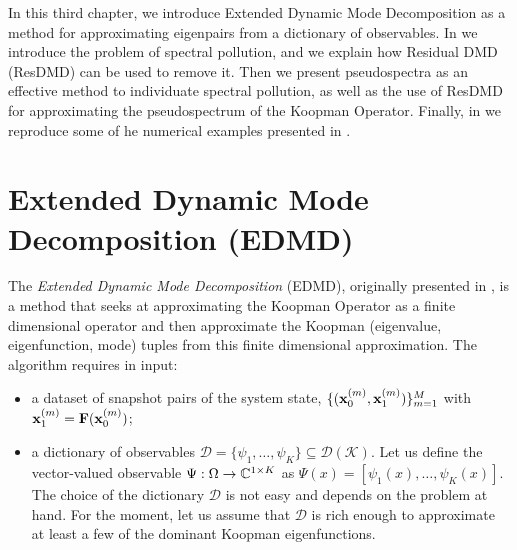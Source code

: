 \label{chapter_edmd}
In this third chapter, we introduce Extended Dynamic Mode Decomposition as a method for approximating eigenpairs from a dictionary of observables. In  we introduce the problem of spectral pollution, and we explain how Residual DMD (ResDMD) can be used to remove it. Then we present pseudospectra as an effective method to individuate spectral pollution, as well as the use of ResDMD for approximating the pseudospectrum of the Koopman Operator. Finally, in  we reproduce some of he numerical examples presented in \cite{colbrook_rigorous_2021}.

\section{Extended Dynamic Mode Decomposition (EDMD)}
\label{section_edmd}
The \emph{Extended Dynamic Mode Decomposition} (EDMD), originally presented in \cite{williams_data-driven_2015}, is a method that seeks at approximating the Koopman Operator as a finite dimensional operator and then approximate the Koopman (eigenvalue, eigenfunction, mode) tuples from this finite dimensional approximation. The algorithm requires in input:
\begin{itemize}
    \item a dataset of snapshot pairs of the system state, $\{(\vb{x}_0^{(m)}, \vb{x}_1^{(m)})\}_{m = 1}^M$ with $\vb{x}_1^{(m)} = \vb{F}(\vb{x}_0^{(m)})$;
    \item a dictionary of observables $\mathcal{D} = \{\psi_1, \dots, \psi_K\} \subseteq \mathcal{D}(\mathcal{K})$. Let us define the vector-valued observable $\Psi:\Omega\to\mathbb{C}^{1\times K}$ as $\Psi(x) = [\psi_1(x), \dots, \psi_K(x)]$. The choice of the dictionary $\mathcal{D}$ is not easy and depends on the problem at hand. For the moment, let us assume that $\mathcal{D}$ is rich enough to approximate at least a few of the dominant Koopman eigenfunctions.
\end{itemize}

